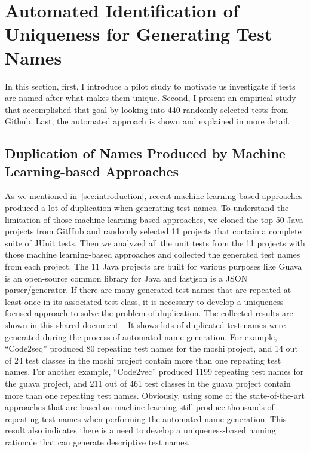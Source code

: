 \section{Automated Identification of Uniqueness for Generating Test Names}

In this section, first, I introduce a pilot study to motivate us investigate if tests are named after what makes them unique.
%
Second, I present an empirical study that accomplished that goal by looking into \num{440} randomly selected tests from Github.
%
Last, the automated approach is shown and explained in more detail.


\subsection{Duplication of Names Produced by Machine Learning-based Approaches}
\label{sec:duplication-names}

As we mentioned in~\cref{sec:introduction}, recent machine learning-based approaches produced a lot of duplication when generating test names.
%
To understand the limitation of those machine learning-based approaches, we cloned the top \num{50} Java projects from GitHub and randomly selected \num{11} projects that contain a complete suite of JUnit tests.
%
Then we analyzed all the unit tests from the \num{11} projects with those machine learning-based approaches and collected the generated test names from each project.
%
The \num{11} Java projects are built for various purposes like Guava is an open-source common library for Java and fastjson is a JSON parser\slash generator.
%
If there are many generated test names that are repeated at least once in its associated test class, it is necessary to develop a uniqueness-focused approach to solve the problem of duplication.
%
The collected results are shown in this shared document~\cite{CodeResult}.
%
It shows lots of duplicated test names were generated during the process of automated name generation. 
%
For example, \enquote{Code2seq} produced \num{80} repeating test names for the moshi project, and \num{14} out of \num{24} test classes in the moshi project contain more than one repeating test names.
%
For another example, \enquote{Code2vec} produced \num{1199} repeating test names for the guava project, and \num{211} out of \num{461} test classes in the guava project contain more than one repeating test names.
%
Obviously, using some of the state-of-the-art approaches that are based on machine learning still produce thousands of repeating test names when performing the automated name generation.
%
This result also indicates there is a need to develop a uniqueness-based naming rationale that can generate descriptive test names.


